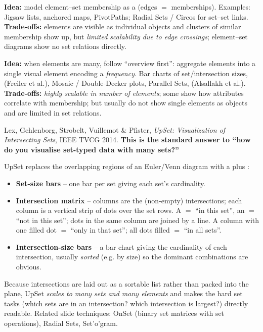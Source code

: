 \begin{algobox}
\textbf{Idea:} model element--set membership as a  (edges
$=$ memberships). Examples: Jigsaw lists, anchored maps, PivotPaths; Radial
Sets / Circos for set--set links.\\
\textbf{Trade-offs:} elements are visible as individual objects and clusters of
similar membership show up, but \emph{limited scalability due to edge
crossings}; element--set diagrams show no set relations directly.
\end{algobox}

\begin{algobox}
\textbf{Idea:} when elements are many, follow ``overview first'': aggregate
elements into a single visual element encoding a \emph{frequency}. Bar charts of
set/intersection sizes,  (Freiler et al.), Mosaic / Double-Decker
plots, Parallel Sets,  (Alsallakh et al.).\\
\textbf{Trade-offs:} \emph{highly scalable in number of elements}; some show how
attributes correlate with membership; but usually do not show single elements
as objects and are limited in set relations.
\end{algobox}

\begin{keybox}
Lex, Gehlenborg, Strobelt, Vuillemot \& Pfister, \emph{UpSet: Visualization of
Intersecting Sets}, IEEE TVCG 2014. \textbf{This is the standard answer to
``how do you visualise set-typed data with many sets?''}
\end{keybox}

UpSet replaces the overlapping regions of an Euler/Venn diagram with a
 plus :
\begin{itemize}
\item \textbf{Set-size bars} -- one bar per set giving each set's cardinality.
\item \textbf{Intersection matrix} -- columns are the (non-empty) intersections;
  each column is a vertical strip of dots over the set rows. A  $=$ ``in this set'', an  $=$ ``not in this set''; dots in
  the same column are joined by a line. A column with one filled dot $=$
  ``only in that set''; all dots filled $=$ ``in all sets''.
\item \textbf{Intersection-size bars} -- a bar chart giving the cardinality of
  each intersection, usually \emph{sorted} (e.g. by size) so the dominant
  combinations are obvious.
\end{itemize}
Because intersections are laid out as a sortable list rather than packed into
the plane, UpSet \emph{scales to many sets and many elements} and makes the
hard set tasks (which sets are in an intersection? which intersection is
largest?) directly readable. Related slide techniques: OnSet (binary
set matrices with set operations), Radial Sets, Set'o'gram.

